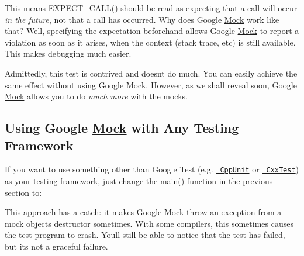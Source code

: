 This means {\ttfamily \mbox{\hyperlink{googletest-master_2googlemock_2include_2gmock_2gmock-spec-builders_8h_a535a6156de72c1a2e25a127e38ee5232}{E\+X\+P\+E\+C\+T\+\_\+\+C\+A\+L\+L()}}} should be read as expecting that a call will occur {\itshape in the future}, not that a call has occurred. Why does Google \mbox{\hyperlink{class_mock}{Mock}} work like that? Well, specifying the expectation beforehand allows Google \mbox{\hyperlink{class_mock}{Mock}} to report a violation as soon as it arises, when the context (stack trace, etc) is still available. This makes debugging much easier.

Admittedly, this test is contrived and doesn\textquotesingle{}t do much. You can easily achieve the same effect without using Google \mbox{\hyperlink{class_mock}{Mock}}. However, as we shall reveal soon, Google \mbox{\hyperlink{class_mock}{Mock}} allows you to do {\itshape much more} with the mocks.

\subsection*{Using Google \mbox{\hyperlink{class_mock}{Mock}} with Any Testing Framework}

If you want to use something other than Google Test (e.\+g. \href{http://sourceforge.net/projects/cppunit/}{\texttt{ Cpp\+Unit}} or \href{https://cxxtest.com/}{\texttt{ Cxx\+Test}}) as your testing framework, just change the {\ttfamily \mbox{\hyperlink{_be_01vektoriaus_2main_8cpp_ae66f6b31b5ad750f1fe042a706a4e3d4}{main()}}} function in the previous section to\+: 
\begin{DoxyCode}{0}
\DoxyCodeLine{\}}
\end{DoxyCode}


This approach has a catch\+: it makes Google \mbox{\hyperlink{class_mock}{Mock}} throw an exception from a mock object\textquotesingle{}s destructor sometimes. With some compilers, this sometimes causes the test program to crash. You\textquotesingle{}ll still be able to notice that the test has failed, but it\textquotesingle{}s not a graceful failure.

